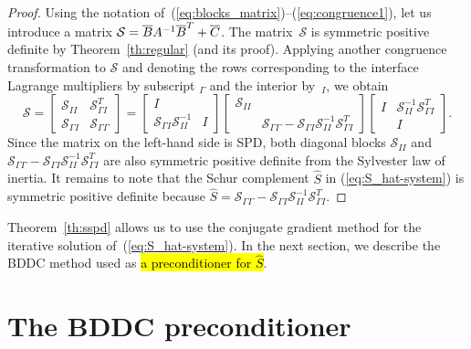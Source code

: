 \begin{proof}
Using the notation of~(\ref{eq:blocks_matrix})--(\ref{eq:congruence1}),
let us introduce a matrix $\mathcal{S} = \overline{B}A^{-1}\overline{B}^T + \overline{C}$.
The matrix~$\mathcal{S}$ is symmetric positive definite by Theorem~\ref{th:regular} (and its proof).
Applying another congruence transformation to $\mathcal{S}$
and denoting the rows corresponding to the interface Lagrange multipliers  by subscript $_{\Gamma}$
and the interior by~$_{I}$,
we obtain
\begin{equation}
\label{eq:proof}
\mathcal{S}
=
\left[
\begin{matrix}
\mathcal{S}_{II}       & \mathcal{S}_{\Gamma I}^T  \\
\mathcal{S}_{\Gamma I} & \mathcal{S}_{\Gamma \Gamma}
\end{matrix}
\right]
=
\left[
\begin{matrix}
I                                          &   \\
\mathcal{S}_{\Gamma I} \mathcal{S}_{II}^{-1} & I
\end{matrix}
\right]
\left[
\begin{matrix}
\mathcal{S}_{II} &   \\
& \mathcal{S}_{\Gamma \Gamma} - \mathcal{S}_{\Gamma I} \mathcal{S}_{II}^{-1} \mathcal{S}_{\Gamma I}^{T}
\end{matrix}
\right]
\left[
\begin{matrix}
I    & \mathcal{S}_{II}^{-1} \mathcal{S}_{\Gamma I}^{T}  \\
& I
\end{matrix}
\right].
\end{equation}
Since the matrix on the left-hand side is SPD,
both diagonal blocks $\mathcal{S}_{II}$
and $\mathcal{S}_{\Gamma \Gamma} - \mathcal{S}_{\Gamma I} \mathcal{S}_{II}^{-1} \mathcal{S}_{\Gamma I}^{T}$
are also symmetric positive definite from the Sylvester law of inertia.
It remains to note that the Schur complement $\widehat{S}$ in (\ref{eq:S_hat-system}) is symmetric positive definite
because
$\widehat{S} = \mathcal{S}_{\Gamma \Gamma} - \mathcal{S}_{\Gamma I} \mathcal{S}_{II}^{-1} \mathcal{S}_{\Gamma I}^{T}$.
\end{proof}


Theorem~\ref{th:sspd} allows us to use the conjugate gradient method for the iterative solution 
of~(\ref{eq:S_hat-system}). 
In the next section, we describe the BDDC method used as \hl{a preconditioner for $\widehat{S}$}.

\section{The BDDC preconditioner}

